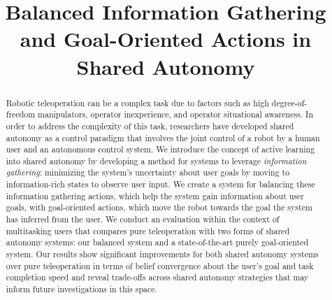 \documentclass[conference]{IEEEtran}
\begin{document}
\title{Balanced Information Gathering and Goal-Oriented Actions in Shared Autonomy
}


\author{}

\maketitle

\begin{abstract}
Robotic teleoperation can be a complex task due to factors such as high degree-of-freedom manipulators, operator inexperience, and operator situational awareness. In order to address the complexity of this task, researchers have developed shared autonomy as a control paradigm that involves the joint control of a robot by a human user and an autonomous control system. We introduce the concept of active learning into shared autonomy by developing a method for systems to leverage \textit{information gathering}: minimizing the system's uncertainty about user goals by moving to information-rich states to observe user input. We create a system for balancing these information gathering actions, which help the system gain information about user goals, with goal-oriented actions, which move the robot towards the goal the system has inferred from the user. We conduct an evaluation within the context of multitasking users that compares pure teleoperation with two forms of shared autonomy systems: our balanced system and a state-of-the-art purely goal-oriented system. Our results show significant improvements for both shared autonomy systems over pure teleoperation in terms of belief convergence about the user's goal and task completion speed and reveal trade-offs across shared autonomy strategies that may inform future investigations in this space.
\end{abstract}
\end{document}
